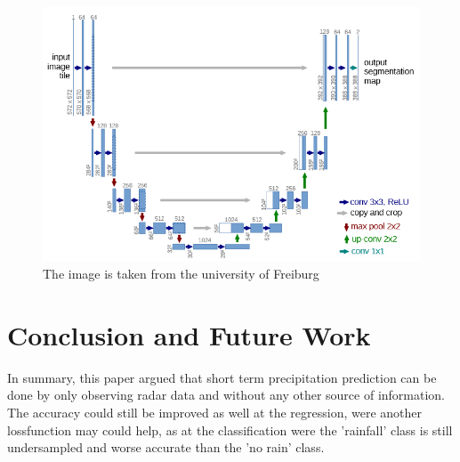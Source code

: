 \documentclass[oneside]{htwg-report}
\begin{document}
\begin{figure}[ht]
    \centering
    \includegraphics[width=0.8\linewidth]{../pics/UNet_Biomedical}
    \caption{The image is taken from the university of Freiburg~\cite{ronneberger2015u}}
\end{figure}

\section*{Conclusion and Future Work}
In summary, this paper argued that short term precipitation prediction can be done by only observing radar data and without any other source of information.
The accuracy could still be improved as well at the regression, were another lossfunction may could help, as at the classification were the 'rainfall' class is still undersampled and worse accurate than the 'no rain' class.
\end{document}
